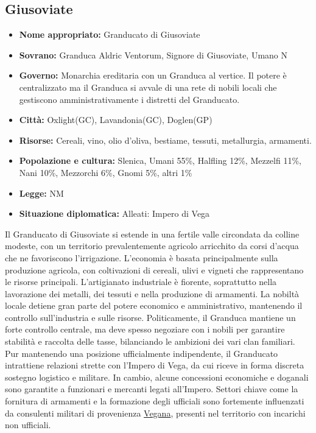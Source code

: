 \documentclass[10pt, a4paper]{report}
\begin{document}
\begin{multicols}{2}
\subsection*{Giusoviate}
\begin{itemize}
	\item \textbf{Nome appropriato:} Granducato di Giusoviate
	\item \textbf{Sovrano:} Granduca Aldric Ventorum, Signore di Giusoviate, Umano N
	\item \textbf{Governo:} Monarchia ereditaria con un Granduca al vertice. Il potere è centralizzato ma il Granduca si avvale di una rete di nobili locali che gestiscono amministrativamente i distretti del Granducato.
	\item \textbf{Città:} Oxlight(GC), Lavandonia(GC), Doglen(GP) 
	\item \textbf{Risorse:} Cereali, vino, olio d'oliva, bestiame, tessuti, metallurgia, armamenti.
	\item \textbf{Popolazione e cultura:} Slenica, Umani 55\%, Halfling 12\%, Mezzelfi 11\%, Nani 10\%, Mezzorchi 6\%, Gnomi 5\%, altri 1\%
	\item \textbf{Legge:} NM
	\item \textbf{Situazione diplomatica:} Alleati: Impero di Vega
\end{itemize}
Il Granducato di Giusoviate si estende in una fertile valle circondata da colline modeste, con un territorio prevalentemente agricolo arricchito da corsi d’acqua che ne favoriscono l’irrigazione. L’economia è basata principalmente sulla produzione agricola, con coltivazioni di cereali, ulivi e vigneti che rappresentano le risorse principali. L’artigianato industriale è fiorente, soprattutto nella lavorazione dei metalli, dei tessuti e nella produzione di armamenti.
La nobiltà locale detiene gran parte del potere economico e amministrativo, mantenendo il controllo sull'industria e sulle risorse. Politicamente, il Granduca mantiene un forte controllo centrale, ma deve spesso negoziare con i nobili per garantire stabilità e raccolta delle tasse, bilanciando le ambizioni dei vari clan familiari.
Pur mantenendo una posizione ufficialmente indipendente, il Granducato intrattiene relazioni strette con l’Impero di Vega, da cui riceve in forma discreta sostegno logistico e militare. In cambio, alcune concessioni economiche e doganali sono garantite a funzionari e mercanti legati all’Impero. Settori chiave come la fornitura di armamenti e la formazione degli ufficiali sono fortemente influenzati da consulenti militari di provenienza \href{https://velvetdogs.com/media/templates_webp/template_blackbeard-writing.webp}{Vegana}, presenti nel territorio con incarichi non ufficiali.



\end{multicols}
\end{document}
